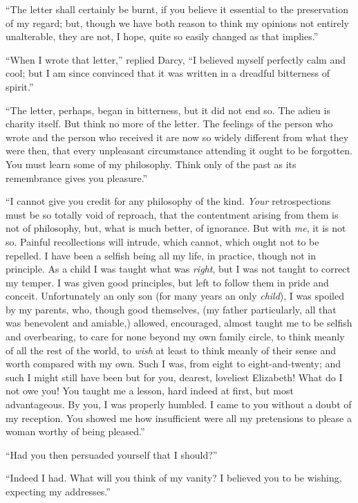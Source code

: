 \documentclass[12pt]{book}
\begin{document}
``The letter shall certainly be burnt, if you believe it essential to the preservation of my regard; but, though we have both reason to think my opinions not entirely unalterable, they are not, I hope, quite so easily changed as that implies.''

``When I wrote that letter,'' replied Darcy, ``I believed myself perfectly calm and cool; but I am since convinced that it was written in a dreadful bitterness of spirit.''

``The letter, perhaps, began in bitterness, but it did not end so. The adieu is charity itself. But think no more of the letter. The feelings of the person who wrote and the person who received it are now so widely different from what they were then, that every unpleasant circumstance attending it ought to be forgotten. You must learn some of my philosophy. Think only of the past as its remembrance gives you pleasure.''

``I cannot give you credit for any philosophy of the kind. \textit{Your} retrospections must be so totally void of reproach, that the contentment arising from them is not of philosophy, but, what is much better, of ignorance. But with \textit{me}, it is not so. Painful recollections will intrude, which cannot, which ought not to be repelled. I have been a selfish being all my life, in practice, though not in principle. As a child I was taught what was \textit{right}, but I was not taught to correct my temper. I was given good principles, but left to follow them in pride and conceit. Unfortunately an only son (for many years an only \textit{child}), I was spoiled by my parents, who, though good themselves, (my father particularly, all that was benevolent and amiable,) allowed, encouraged, almost taught me to be selfish and overbearing, to care for none beyond my own family circle, to think meanly of all the rest of the world, to \textit{wish} at least to think meanly of their sense and worth compared with my own. Such I was, from eight to eight-and-twenty; and such I might still have been but for you, dearest, loveliest Elizabeth! What do I not owe you! You taught me a lesson, hard indeed at first, but most advantageous. By you, I was properly humbled. I came to you without a doubt of my reception. You showed me how insufficient were all my pretensions to please a woman worthy of being pleased.''

``Had you then persuaded yourself that I should?''

``Indeed I had. What will you think of my vanity? I believed you to be wishing, expecting my addresses.''
\end{document}
